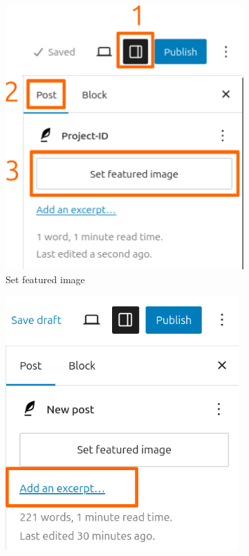 \begin{figure}[h!]
    \centering
    \begin{subfigure}[b]{0.4\textwidth}
        \centering
        \includegraphics[width=\textwidth]{Image/Process/featured_image.png}
        \caption{Set featured image}
        \label{fig:featured_image}
    \end{subfigure}
    \hfill
    \begin{subfigure}[b]{0.4\textwidth}
        \centering
        \includegraphics[width=\linewidth]{Image/Process/excerpt.png}

\end{subfigure}
\end{figure}
